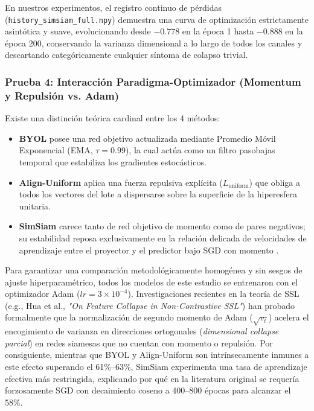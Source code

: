 En nuestros experimentos, el registro continuo de pérdidas (\texttt{history\_simsiam\_full.npy}) demuestra una curva de optimización estrictamente asintótica y suave, evolucionando desde $-0.778$ en la época 1 hasta $-0.888$ en la época 200, conservando la varianza dimensional a lo largo de todos los canales y descartando categóricamente cualquier síntoma de colapso trivial.

\subsubsection{Prueba 4: Interacción Paradigma-Optimizador (Momentum y Repulsión vs. Adam)}
Existe una distinción teórica cardinal entre los 4 métodos:
\begin{itemize}
    \item \textbf{BYOL} posee una red objetivo actualizada mediante Promedio Móvil Exponencial (EMA, $\tau = 0.99$), la cual actúa como un filtro pasobajas temporal que estabiliza los gradientes estocásticos.
    \item \textbf{Align-Uniform} aplica una fuerza repulsiva explícita ($L_{\text{uniform}}$) que obliga a todos los vectores del lote a dispersarse sobre la superficie de la hiperesfera unitaria.
    \item \textbf{SimSiam} carece tanto de red objetivo de momento como de pares negativos; su estabilidad reposa exclusivamente en la relación delicada de velocidades de aprendizaje entre el proyector y el predictor bajo SGD con momento \cite{chen2021simsiam}.
\end{itemize}
Para garantizar una comparación metodológicamente homogénea y sin sesgos de ajuste hiperparamétrico, todos los modelos de este estudio se entrenaron con el optimizador Adam ($lr = 3 \times 10^{-4}$). Investigaciones recientes en la teoría de SSL (e.g., Hua et al., \textit{"On Feature Collapse in Non-Contrastive SSL"}) han probado formalmente que la normalización de segundo momento de Adam ($\sqrt{v_t}$) acelera el encogimiento de varianza en direcciones ortogonales (\textit{dimensional collapse parcial}) en redes siamesas que no cuentan con momento o repulsión. Por consiguiente, mientras que BYOL y Align-Uniform son intrínsecamente inmunes a este efecto superando el 61\%--63\%, SimSiam experimenta una tasa de aprendizaje efectiva más restringida, explicando por qué en la literatura original se requería forzosamente SGD con decaimiento coseno a 400--800 épocas para alcanzar el 58\%.

